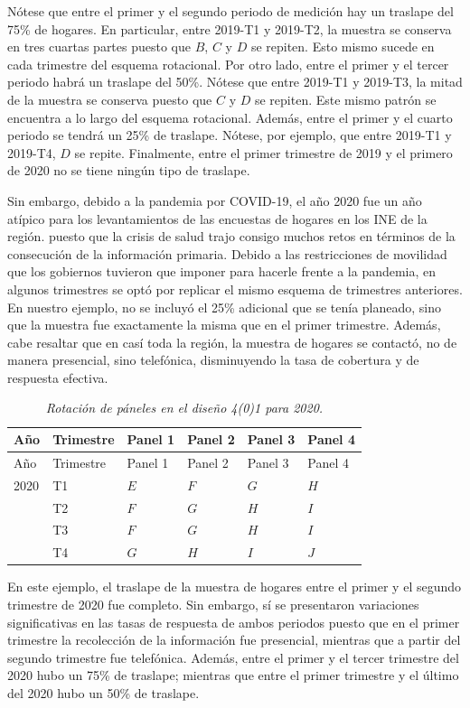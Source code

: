\documentclass[
  10pt,
  spanish,
]{book}
\begin{document}
Nótese que entre el primer y el segundo periodo de medición hay un traslape del 75\% de hogares. En particular, entre 2019-T1 y 2019-T2, la muestra se conserva en tres cuartas partes puesto que \(B\), \(C\) y \(D\) se repiten. Esto mismo sucede en cada trimestre del esquema rotacional. Por otro lado, entre el primer y el tercer periodo habrá un traslape del 50\%. Nótese que entre 2019-T1 y 2019-T3, la mitad de la muestra se conserva puesto que \(C\) y \(D\) se repiten. Este mismo patrón se encuentra a lo largo del esquema rotacional. Además, entre el primer y el cuarto periodo se tendrá un 25\% de traslape. Nótese, por ejemplo, que entre 2019-T1 y 2019-T4, \(D\) se repite. Finalmente, entre el primer trimestre de 2019 y el primero de 2020 no se tiene ningún tipo de traslape.

Sin embargo, debido a la pandemia por COVID-19, el año 2020 fue un año atípico para los levantamientos de las encuestas de hogares en los INE de la región. puesto que la crisis de salud trajo consigo muchos retos en términos de la consecución de la información primaria. Debido a las restricciones de movilidad que los gobiernos tuvieron que imponer para hacerle frente a la pandemia, en algunos trimestres se optó por replicar el mismo esquema de trimestres anteriores. En nuestro ejemplo, no se incluyó el 25\% adicional que se tenía planeado, sino que la muestra fue exactamente la misma que en el primer trimestre. Además, cabe resaltar que en casí toda la región, la muestra de hogares se contactó, no de manera presencial, sino telefónica, disminuyendo la tasa de cobertura y de respuesta efectiva.

\begin{longtable}[]{@{}llllll@{}}
\caption{\emph{Rotación de páneles en el diseño 4(0)1 para 2020.}}\tabularnewline
\toprule
Año & Trimestre & Panel 1 & Panel 2 & Panel 3 & Panel 4 \\
\midrule
\endfirsthead
\toprule
Año & Trimestre & Panel 1 & Panel 2 & Panel 3 & Panel 4 \\
\midrule
\endhead
2020 & T1 & \(E\) & \(F\) & \(G\) & \(H\) \\
& T2 & \(F\) & \(G\) & \(H\) & \(I\) \\
& T3 & \(F\) & \(G\) & \(H\) & \(I\) \\
& T4 & \(G\) & \(H\) & \(I\) & \(J\) \\
\bottomrule
\end{longtable}

En este ejemplo, el traslape de la muestra de hogares entre el primer y el segundo trimestre de 2020 fue completo. Sin embargo, sí se presentaron variaciones significativas en las tasas de respuesta de ambos periodos puesto que en el primer trimestre la recolección de la información fue presencial, mientras que a partir del segundo trimestre fue telefónica. Además, entre el primer y el tercer trimestre del 2020 hubo un 75\% de traslape; mientras que entre el primer trimestre y el último del 2020 hubo un 50\% de traslape.
\end{document}
